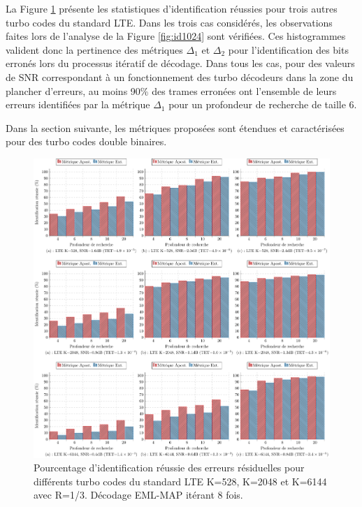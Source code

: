 La Figure \ref{fig:idLTE} présente les statistiques d'identification réussies pour trois autres turbo codes du standard 
LTE. Dans les trois cas considérés, les observations faites lors de l'analyse de la Figure \ref{fig:id1024} sont
vérifiées. Ces histogrammes valident donc la pertinence des métriques $\Delta_1$ et $\Delta_2$ pour l'identification des bits 
erronés lors du processus itératif de décodage. Dans tous les cas, pour des valeurs de SNR correspondant à un fonctionnement des 
turbo décodeurs dans la zone du plancher d'erreurs, au moins 90\% des trames erronées ont l'ensemble de leurs erreurs 
identifiées par la métrique $\Delta_1$ pour un profondeur de recherche de taille 6.

Dans la section suivante, les métriques proposées sont étendues et caractérisées pour des turbo codes double 
binaires. 

\begin{figure}[!h]
	\centering
	\includegraphics[width=1\textwidth]{main/ch3_fig/id2/tikz/lte.pdf}
	\caption{Pourcentage d'identification réussie des erreurs résiduelles pour différents turbo codes du standard LTE K=528, K=2048 et K=6144 avec R=1/3.
	Décodage EML-MAP itérant 8 fois. \label{fig:idLTE}}
\end{figure}

